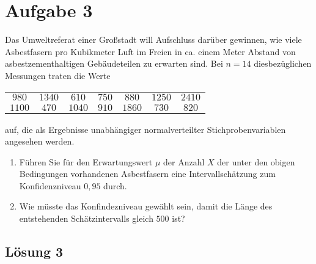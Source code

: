\documentclass[main.tex]{subfiles}
\begin{document}
\section{Aufgabe 3}
Das Umweltreferat einer Großstadt will Aufschluss darüber gewinnen, wie viele Asbestfasern pro Kubikmeter Luft im Freien in ca. einem Meter Abstand von asbestzementhaltigen Gebäudeteilen zu erwarten sind. Bei $n=14$ diesbezüglichen Messungen traten die Werte
\begin{center}
\begin{tabular}{*{7}{c}}
$980$ & $1340$ & $610$ & $750$ & $880$ & $1250$ & $2410$ \\
$1100$ & $470$ & $1040$ & $910$ & $1860$ & $730$ & $820$
\end{tabular}
\end{center}
auf, die als Ergebnisse unabhängiger normalverteilter Stichprobenvariablen angesehen werden.
\begin{enumerate}
\item Führen Sie für den Erwartungswert $\mu$ der Anzahl $X$ der unter den obigen Bedingungen vorhandenen Asbestfasern eine Intervallschätzung zum Konfidenzniveau $0,95$ durch.
\item Wie müsste das Konfindezniveau gewählt sein, damit die Länge des entstehenden Schätzintervalls gleich $500$ ist?
\end{enumerate}

\subsection{Lösung 3}
\end{document}
